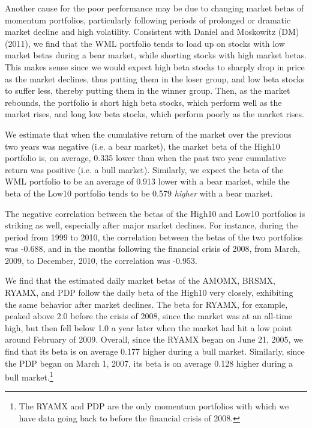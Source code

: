 \documentclass[12pt]{article}
\begin{document}
Another cause for the poor performance may be due to changing market betas of momentum portfolios, particularly following periods of prolonged or dramatic market decline and high volatility. Consistent with Daniel and Moskowitz (DM) (2011), we find that the WML portfolio tends to load up on stocks with low market betas during a bear market, while shorting stocks with high market betas. This makes sense since we would expect high beta stocks to sharply drop in price as the market declines, thus putting them in the loser group, and low beta stocks to suffer less, thereby putting them in the winner group. Then, as the market rebounds, the portfolio is short high beta stocks, which perform well as the market rises, and long low beta stocks, which perform poorly as the market rises. 

We estimate that when the cumulative return of the market over the previous two years was negative (i.e. a bear market), the market beta of the High10 portfolio is, on average, 0.335 lower than when the past two year cumulative return was positive (i.e. a bull market). Similarly, we expect the beta of the WML portfolio to be an average of 0.913 lower with a bear market, while the beta of the Low10 portfolio tends to be 0.579 \emph{higher} with a bear market. 

The negative correlation between the betas of the High10 and Low10 portfolios is striking as well, especially after major market declines. For instance, during the period from 1999 to 2010, the correlation between the betas of the two portfolios was -0.688, and in the months following the financial crisis of 2008, from March, 2009, to December, 2010, the correlation was -0.953.

We find that the estimated daily market betas of the AMOMX, BRSMX, RYAMX, and PDP follow the daily beta of the High10 very closely, exhibiting the same behavior after market declines. The beta for RYAMX, for example, peaked above 2.0 before the crisis of 2008, since the market was at an all-time high, but then fell below 1.0 a year later when the market had hit a low point around February of 2009. Overall, since the RYAMX began on June 21, 2005, we find that its beta is on average 0.177 higher during a bull market. Similarly, since the PDP began on March 1, 2007, its beta is on average 0.128 higher during a bull market.\footnote{The RYAMX and PDP are the only momentum portfolios with which we have data going back to before the financial crisis of 2008.}
\end{document}
